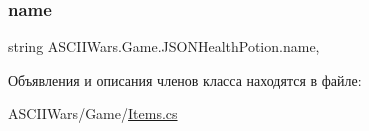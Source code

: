 \subsubsection{\texorpdfstring{name}{name}}
{\footnotesize\ttfamily string A\+S\+C\+I\+I\+Wars.\+Game.\+J\+S\+O\+N\+Health\+Potion.\+name\hspace{0.3cm}{\ttfamily [get]}, {\ttfamily [set]}}



Объявления и описания членов класса находятся в файле\+:\begin{DoxyCompactItemize}
\item 
A\+S\+C\+I\+I\+Wars/\+Game/\hyperlink{_items_8cs}{Items.\+cs}\end{DoxyCompactItemize}
